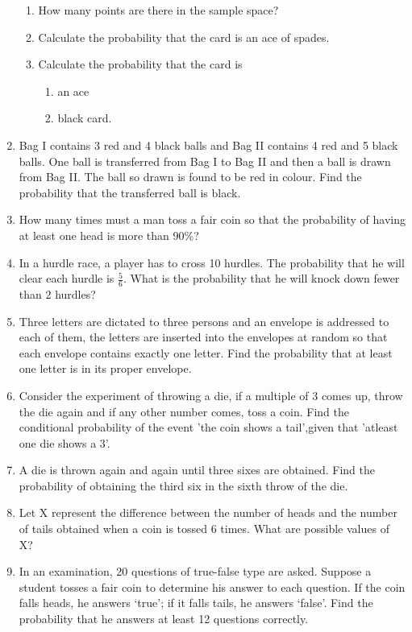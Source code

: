 \begin{enumerate}[label=\thechapter.\arabic*,ref=\thechapter.\theenumi]
\begin{enumerate}
\item How many points are there in the sample space?
\item Calculate the probability that the card is an ace of spades.
\item Calculate the probability that the card is 
           \begin{enumerate}
           \item an ace
           \item black card.
           \end{enumerate}
\end{enumerate}
\item Bag I contains 3 red and 4 black balls and Bag II contains 4 red and 5 black balls.
One ball is transferred from Bag I to Bag II and then a ball is drawn from Bag II.
The ball so drawn is found to be red in colour. Find the probability that the
transferred ball is black.
\item How many times must a man toss a fair coin so that the probability of having
at least one head is more than 90\%?
\item In a hurdle race, a player has to cross 10 hurdles. The probability that he will clear each hurdle is $\frac{5}{6}$. What is the probability that he will knock down fewer than 2 hurdles?
\item Three letters are dictated to three persons and an envelope is addressed to each
of them, the letters are inserted into the envelopes at random so that each envelope
contains exactly one letter. Find the probability that at least one letter is in its
proper envelope.
\item Consider the experiment of throwing a die, if a multiple of 3 comes up, throw the die again and if any other number comes, toss a coin. Find the conditional probability of the event 'the coin shows a tail',given that 'atleast one die shows a 3'.
\item A die is thrown again and again until three sixes are obtained. Find the probability of obtaining the third six in the sixth throw of the die.
\item Let X represent the difference between the number of heads and the number of
tails obtained when a coin is tossed 6 times. What are possible values of X?
\item In an examination, 20 questions of true-false type are asked. Suppose a student tosses a fair coin to determine his answer to each question. If the coin falls heads, he answers `true'; if it falls tails, he answers `false'. Find the probability that he answers at least 12 questions correctly.
\end{enumerate}
